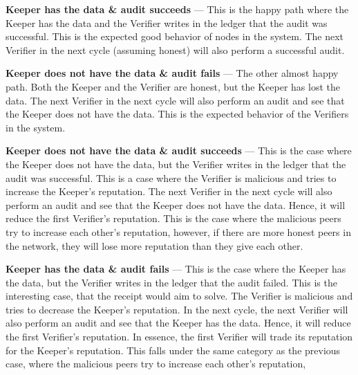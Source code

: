 \textbf{Keeper has the data \& audit succeeds} ---
This is the happy path where the Keeper has the data and the Verifier
writes in the ledger that the audit was successful.
This is the expected good behavior of nodes in the system.
The next Verifier in the next cycle (assuming honest) will also perform a successful audit.

\textbf{Keeper does not have the data \& audit fails} ---
The other almost happy path.
Both the Keeper and the Verifier are honest, but the Keeper has lost the data.
The next Verifier in the next cycle will also perform an audit and see that the Keeper does not have the data.
This is the expected behavior of the Verifiers in the system.

\textbf{Keeper does not have the data \& audit succeeds} ---
This is the case where the Keeper does not have the data, but the Verifier writes in the ledger
that the audit was successful.
This is a case where the Verifier is malicious and tries to increase the Keeper's reputation.
The next Verifier in the next cycle will also perform an audit and see that the Keeper does not have the data.
Hence, it will reduce the first Verifier's reputation.
This is the case where the malicious peers try to increase each other's reputation,
however, if there are more honest peers in the network, they will lose more reputation than they give each other.

\textbf{Keeper has the data \& audit fails} ---
This is the case where the Keeper has the data, but the Verifier writes in the ledger
that the audit failed.
This is the interesting case, that the receipt would aim to solve.
The Verifier is malicious and tries to decrease the Keeper's reputation.
In the next cycle, the next Verifier will also perform an audit and see that the Keeper has the data.
Hence, it will reduce the first Verifier's reputation.
In essence, the first Verifier will trade its reputation for the Keeper's reputation.
This falls under the same category as the previous case, where the malicious peers try to increase each other's reputation,
